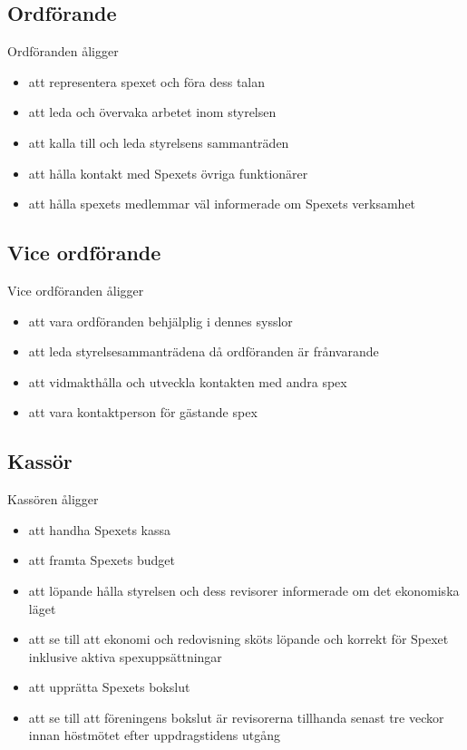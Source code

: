 \documentclass[a4paper]{article}
\begin{document}
\subsection{Ordförande}
Ordföranden åligger

\begin{itemize}
  \item att representera spexet och föra dess talan
  \item att leda och övervaka arbetet inom styrelsen
  \item att kalla till och leda styrelsens sammanträden
  \item att hålla kontakt med Spexets övriga funktionärer
  \item att hålla spexets medlemmar väl informerade om Spexets verksamhet
\end{itemize}

\subsection{Vice ordförande}
Vice ordföranden åligger

\begin{itemize}
  \item att vara ordföranden behjälplig i dennes sysslor
  \item att leda styrelsesammanträdena då ordföranden är frånvarande
  \item att vidmakthålla och utveckla kontakten med andra spex
  \item att vara kontaktperson för gästande spex
\end{itemize}

\subsection{Kassör}
Kassören åligger

\begin{itemize}
  \item att handha Spexets kassa
  \item att framta Spexets budget
  \item att löpande hålla styrelsen och dess revisorer informerade om det ekonomiska läget
  \item att se till att ekonomi och redovisning sköts löpande och korrekt för Spexet inklusive aktiva spexuppsättningar
  \item att upprätta Spexets bokslut
  \item att se till att föreningens bokslut är revisorerna tillhanda senast tre veckor innan höstmötet efter uppdragstidens utgång
\end{itemize}
\end{document}
